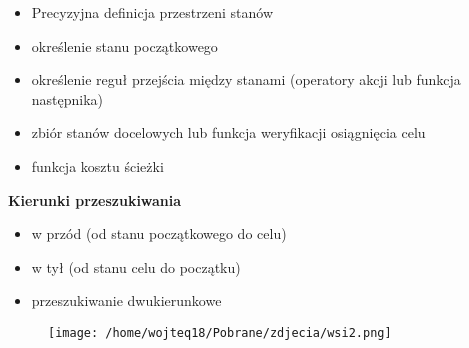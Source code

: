 \documentclass{article}
\begin{document}
\vspace{1\baselineskip}
\begin{itemize}
    \item Precyzyjna definicja przestrzeni stanów
    \item określenie stanu początkowego
    \item określenie reguł przejścia między stanami (operatory akcji lub funkcja następnika)
    \item zbiór stanów docelowych lub funkcja weryfikacji osiągnięcia celu
    \item funkcja kosztu ścieżki
\end{itemize}
\vspace{1\baselineskip}
\textbf{Kierunki przeszukiwania}  \par
\vspace{1\baselineskip}
\begin{itemize}
    \item w przód (od stanu początkowego do celu)
    \item w tył (od stanu celu do początku)
    \item przeszukiwanie dwukierunkowe
\end{itemize}
\vspace{1\baselineskip}
\begin{figure}[H]
    \centering
    \texttt{[image: /home/wojteq18/Pobrane/zdjecia/wsi2.png]}
    \label{fig:example_image}
\end{figure}
\vspace{1\baselineskip}
\end{document}
